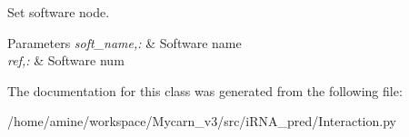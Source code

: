 \-Set software node. 


\begin{DoxyParams}{\-Parameters}
{\em soft\-\_\-name,\-:} & \-Software name \\
\hline
{\em ref,\-:} & \-Software num \\
\hline
\end{DoxyParams}


\-The documentation for this class was generated from the following file\-:\begin{DoxyCompactItemize}
\item 
/home/amine/workspace/\-Mycarn\-\_\-v3/src/i\-R\-N\-A\-\_\-pred/\-Interaction.\-py\end{DoxyCompactItemize}
